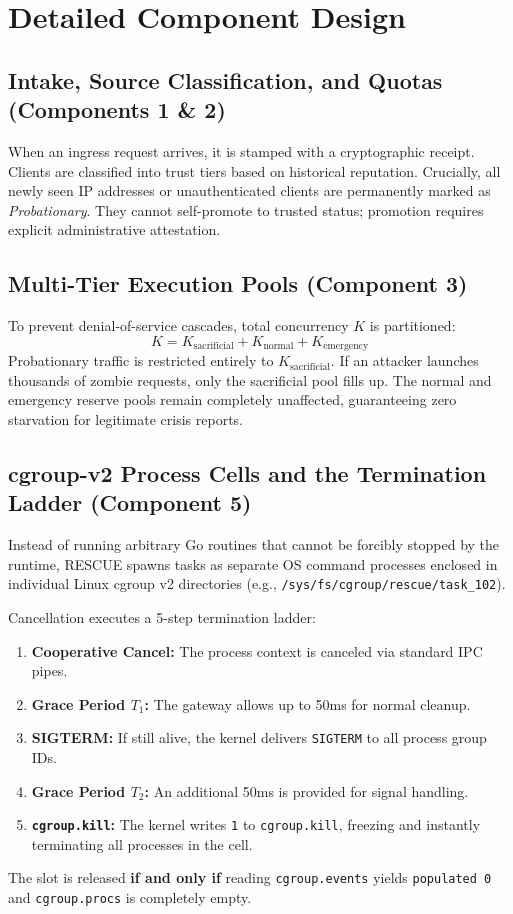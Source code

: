 \documentclass[12pt,a4paper]{report}
\begin{document}
\section{Detailed Component Design}

\subsection{Intake, Source Classification, and Quotas (Components 1 \& 2)}
When an ingress request arrives, it is stamped with a cryptographic receipt. Clients are classified into trust tiers based on historical reputation. Crucially, all newly seen IP addresses or unauthenticated clients are permanently marked as \textit{Probationary}. They cannot self-promote to trusted status; promotion requires explicit administrative attestation.

\subsection{Multi-Tier Execution Pools (Component 3)}
To prevent denial-of-service cascades, total concurrency $K$ is partitioned:
\begin{equation}
    K = K_{\text{sacrificial}} + K_{\text{normal}} + K_{\text{emergency}}
\end{equation}
Probationary traffic is restricted entirely to $K_{\text{sacrificial}}$. If an attacker launches thousands of zombie requests, only the sacrificial pool fills up. The normal and emergency reserve pools remain completely unaffected, guaranteeing zero starvation for legitimate crisis reports.

\subsection{cgroup-v2 Process Cells and the Termination Ladder (Component 5)}
Instead of running arbitrary Go routines that cannot be forcibly stopped by the runtime, RESCUE spawns tasks as separate OS command processes enclosed in individual Linux cgroup v2 directories (e.g., \texttt{/sys/fs/cgroup/rescue/task\_102}). 

Cancellation executes a 5-step termination ladder:
\begin{enumerate}
    \item \textbf{Cooperative Cancel:} The process context is canceled via standard IPC pipes.
    \item \textbf{Grace Period $T_1$:} The gateway allows up to 50ms for normal cleanup.
    \item \textbf{SIGTERM:} If still alive, the kernel delivers \texttt{SIGTERM} to all process group IDs.
    \item \textbf{Grace Period $T_2$:} An additional 50ms is provided for signal handling.
    \item \textbf{\texttt{cgroup.kill}:} The kernel writes \texttt{1} to \texttt{cgroup.kill}, freezing and instantly terminating all processes in the cell.
\end{enumerate}
The slot is released \textbf{if and only if} reading \texttt{cgroup.events} yields \texttt{populated 0} and \texttt{cgroup.procs} is completely empty.
\end{document}
